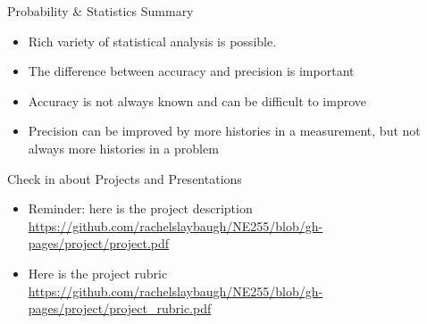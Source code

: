 \documentclass[xcolor=x11names,compress, handout]{beamer}
\renewcommand{\(}{\begin{columns}}
\renewcommand{\)}{\end{columns}}
\newcommand{\<}[1]{\begin{column}{#1}}
\renewcommand{\>}{\end{column}}
\begin{document}
\begin{frame}{Probability \& Statistics Summary}

    \begin{itemize}
    \item Rich variety of statistical analysis is
possible.
\pause
\vspace*{.5em}
    \item The difference between accuracy and
precision is important
\pause
\vspace*{.5em}
    \item Accuracy is not always known and can
be difficult to improve
\pause
\vspace*{.5em}
    \item Precision can be improved by more
histories in a measurement, but not
always more histories in a problem
    \end{itemize}

\end{frame}

\begin{frame}{Check in about Projects and Presentations}

    \begin{itemize}
    \item Reminder: here is the project description 
	\href{https://github.com/rachelslaybaugh/NE255/blob/gh-pages/project/project.pdf}{https://github.com/rachelslaybaugh/NE255/blob/gh-pages/project/project.pdf}
    
\vspace*{.5em}

    \item Here is the project rubric 
    \href{https://github.com/rachelslaybaugh/NE255/blob/gh-pages/project/project_rubric.pdf}{https://github.com/rachelslaybaugh/NE255/blob/gh-pages/project/project\_rubric.pdf}
    \end{itemize}

\end{frame}
\end{document}
